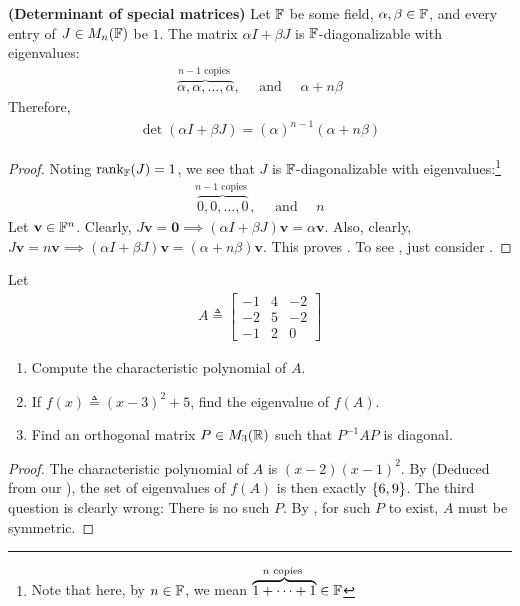 \documentclass{report}
\begin{document}
\begin{theorem}
\label{Dosm}
\textbf{(Determinant of special matrices)} Let $\mathbb{F}$ be some field, $\alpha ,\beta  \in\mathbb{F}$, and every entry of $J\in M_n(\mathbb{F})$ be $1$.  The matrix  $\alpha I+\beta J$ is $\mathbb{F}$-diagonalizable with eigenvalues: 
\begin{align}
\label{alovb}
\overbrace{\alpha ,\alpha ,\dots ,\alpha  }^{n-1\text{ copies }},\quad \text{ and }\quad \alpha +n \beta 
\end{align}
Therefore, 
\begin{align}
\label{dea}
\operatorname{det}(\alpha I+\beta J)= (\alpha)^{n-1}(\alpha +n \beta )
\end{align}
\end{theorem}
\begin{proof}
Noting $\operatorname{rank}_{\mathbb{F}}(J)=1$, we see that $J$ is $\mathbb{F}$-diagonalizable with eigenvalues:\footnote{Note that here, by $n \in \mathbb{F}$, we mean  $\overbrace{1+\cdots +1}^{n\text{ copies }} \in \mathbb{F}$}
\begin{align*}
\overbrace{0,0,\dots ,0}^{n-1\text{ copies }},\quad \text{ and }\quad n
\end{align*}
Let $\textbf{v}\in \mathbb{F}^n$. Clearly, $J\textbf{v}=\textbf{0}\implies (\alpha I+\beta J)\textbf{v}=\alpha \textbf{v}$. Also, clearly,   $J\textbf{v}=n\textbf{v}\implies (\alpha I+\beta J)\textbf{v}=(\alpha +n\beta )\textbf{v}$. This proves . To see , just consider .  
\end{proof}
\begin{question}{}{}
Let 
\begin{align*}
A\triangleq \begin{bmatrix}
  -1 & 4 & -2 \\
  -2 & 5 & -2 \\
  -1 & 2 & 0
\end{bmatrix}
\end{align*}
\begin{enumerate}[label=(\roman*)]
  \item Compute the characteristic polynomial of $A$.  
  \item If $f(x)\triangleq (x-3)^2+5$, find the eigenvalue of $f(A)$. 
  \item Find an orthogonal matrix $P \in M_3(\mathbb{R})$ such that $P^{-1}AP$ is diagonal. 
\end{enumerate}
\end{question}
\begin{proof}
The characteristic polynomial of $A$ is $(x-2)(x-1)^2$. By  (Deduced from our ), the set of eigenvalues of $f(A)$ is then exactly  $\left\{ 6,9 \right\}$. The third question is clearly wrong: There is no such $P$. By , for such  $P$ to exist, $A$ must be symmetric.
\end{proof}
\end{document}
